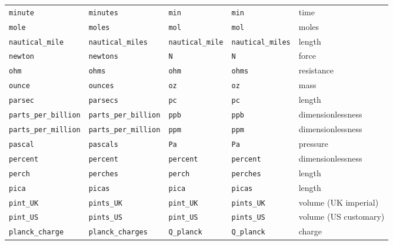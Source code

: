 \begin{landscape}
\begin{center}
\begin{longtable}{|lllll|}
{\tt\footnotesize minute} & {\tt\footnotesize minutes} & {\tt\footnotesize min} & {\tt\footnotesize min} & time \\
{\tt\footnotesize mole} & {\tt\footnotesize moles} & {\tt\footnotesize mol} & {\tt\footnotesize mol} & moles \\
{\tt\footnotesize nautical\_mile} & {\tt\footnotesize nautical\_miles} & {\tt\footnotesize nautical\_mile} & {\tt\footnotesize nautical\_miles} & length \\
{\tt\footnotesize newton} & {\tt\footnotesize newtons} & {\tt\footnotesize N} & {\tt\footnotesize N} & force \\
{\tt\footnotesize ohm} & {\tt\footnotesize ohms} & {\tt\footnotesize ohm} & {\tt\footnotesize ohms} & resistance \\
{\tt\footnotesize ounce} & {\tt\footnotesize ounces} & {\tt\footnotesize oz} & {\tt\footnotesize oz} & mass \\
{\tt\footnotesize parsec} & {\tt\footnotesize parsecs} & {\tt\footnotesize pc} & {\tt\footnotesize pc} & length \\
{\tt\footnotesize parts\_per\_billion} & {\tt\footnotesize parts\_per\_billion} & {\tt\footnotesize ppb} & {\tt\footnotesize ppb} & dimensionlessness \\
{\tt\footnotesize parts\_per\_million} & {\tt\footnotesize parts\_per\_million} & {\tt\footnotesize ppm} & {\tt\footnotesize ppm} & dimensionlessness \\
{\tt\footnotesize pascal} & {\tt\footnotesize pascals} & {\tt\footnotesize Pa} & {\tt\footnotesize Pa} & pressure \\
{\tt\footnotesize percent} & {\tt\footnotesize percent} & {\tt\footnotesize percent} & {\tt\footnotesize percent} & dimensionlessness \\
{\tt\footnotesize perch} & {\tt\footnotesize perches} & {\tt\footnotesize perch} & {\tt\footnotesize perches} & length \\
{\tt\footnotesize pica} & {\tt\footnotesize picas} & {\tt\footnotesize pica} & {\tt\footnotesize picas} & length \\
{\tt\footnotesize pint\_UK} & {\tt\footnotesize pints\_UK} & {\tt\footnotesize pint\_UK} & {\tt\footnotesize pints\_UK} & volume (UK imperial) \\
{\tt\footnotesize pint\_US} & {\tt\footnotesize pints\_US} & {\tt\footnotesize pint\_US} & {\tt\footnotesize pints\_US} & volume (US customary) \\
{\tt\footnotesize planck\_charge} & {\tt\footnotesize planck\_charges} & {\tt\footnotesize Q\_planck} & {\tt\footnotesize Q\_planck} & charge \\

\end{longtable}
\end{center}
\end{landscape}
